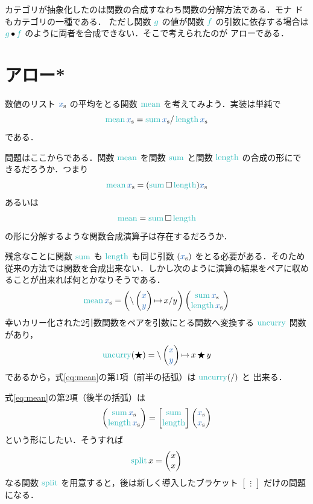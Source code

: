 \documentclass[a5paper,twoside,fleqn,draft]{jsbook}
\begin{document}
\begin{leader}
  カテゴリが抽象化したのは関数の合成すなわち関数の分解方法である．モナ
  ドもカテゴリの一種である．%
  ただし関数 $\hFunc{g}$ の値が関数 $\hFunc{f}$ の引数に依存する場合は
  $\hFunc{g}\mCompCat \hFunc{f}$ のように両者を合成できない．そこで考えられたのが
  アローである．
\end{leader}

\section{アロー*}

数値のリスト $\hListVar{x}$ の平均をとる関数 $\mMean$ を考えてみよう．実装は単純で
\begin{equation}
  \mMean\hListVar{x}
  =\hSum\hListVar{x}/\mLength\hListVar{x}
\end{equation}
である．

問題はここからである．関数 $\mMean$ を関数 $\hSum$ と関数 $\mLength$ の合成の形にできるだろうか．つまり
\begin{equation}
  \mMean\hListVar{x}
  =(\hSum\mSomeOp\mLength)\hListVar{x}
\end{equation}
あるいは
\begin{equation}
  \mMean
  =\hSum\mSomeOp\mLength
\end{equation}
の形に分解するような関数合成演算子は存在するだろうか．

残念なことに関数 $\hSum$ も $\mLength$ も同じ引数 $(\hListVar{x})$ をとる必要がある．そのため従来の方法では関数を合成出来ない．しかし次のように演算の結果をペアに収めることが出来れば何とかなりそうである．
\begin{equation}
  \label{eq:mean}
  \mMean\hListVar{x}
  =
  \left(\mLambda\hPairWith{\hVar{x}}{\hVar{y}}\mLambdaArrow x/y\right)\hPairWith{\hSum\hListVar{x}}{\mLength\hListVar{x}}
\end{equation}
幸いカリー化された2引数関数をペアを引数にとる関数へ変換する
$\hUncurry$ 関数があり，
\begin{equation}
  \hUncurry(\hAnyBinOp)
  =\mLambda\hPairWith{\hVar{x}}{\hVar{y}}\mLambdaArrow x\hAnyBinOp y
\end{equation}
であるから，式\eqref{eq:mean}の第1項（前半の括弧）は $\hUncurry(/)$ と
出来る．

式\eqref{eq:mean}の第2項（後半の括弧）は
\begin{equation}
  \hPairWith{\hSum\hListVar{x}}{\mLength\hListVar{x}}
  =\begin{bmatrix}
  \hSum\\
  \mLength
  \end{bmatrix}
  \hPairWith{\hListVar{x}}{\hListVar{x}}
\end{equation}
という形にしたい．そうすれば
\begin{equation}
  \mSplit x
  =\hPairWith{x}{x}
\end{equation}
なる関数 $\mSplit$ を用意すると，後は新しく導入したブラケット
$\begin{bmatrix}\vdots\end{bmatrix}$ だけの問題になる．
\end{document}
